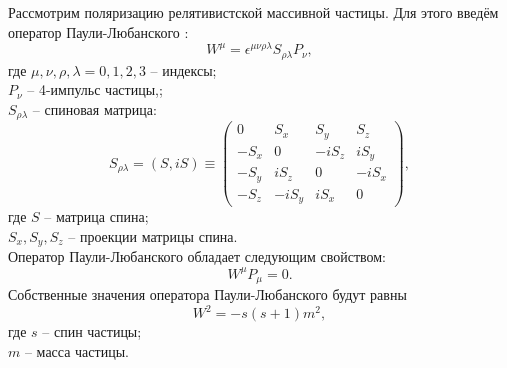 \documentclass{extreport}
\begin{document}
Рассмотрим поляризацию релятивистской массивной частицы. Для этого введём оператор Паули-Любанского \cite{banerjee}:
\begin{equation}
	W^\mu = \epsilon^{\mu\nu\rho\lambda}S_{\rho\lambda}P_\nu,
\end{equation}
где $\mu, \nu, \rho, \lambda = 0, 1, 2, 3$ -- индексы; \\ $P_\nu$ -- 4-импульс частицы,; \\ $S_{\rho\lambda}$ -- спиновая матрица:
\begin{equation}
	S_{\rho\lambda} = (S, iS) \equiv \begin{pmatrix}
		0&S_x&S_y&S_z\\-S_x&0&-iS_z&iS_y\\-S_y&iS_z&0&-iS_x\\-S_z&-iS_y&iS_x&0
	\end{pmatrix},
\end{equation}
где $S$ -- матрица спина; \\
$S_x, S_y, S_z$ -- проекции матрицы спина. \\
Оператор Паули-Любанского обладает следующим свойством:
\begin{equation}
	W^\mu P_\mu = 0.
\end{equation}
Собственные значения оператора Паули-Любанского будут равны
\begin{equation}
	W^2 = -s(s+1)m^2,
\end{equation}
где $s$ -- спин частицы; \\ $m$ -- масса частицы.
\end{document}
